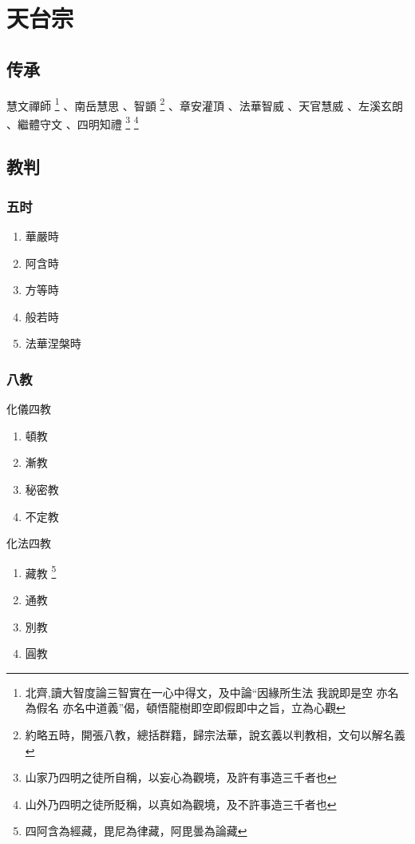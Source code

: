 \section{天台宗}

\subsection{传承}
慧文禪師
\footnote{北齊,讀大智度論三智實在一心中得文，及中論“因緣所生法 我說即是空 亦名為假名 亦名中道義”偈，頓悟龍樹即空即假即中之旨，立為心觀}
、南岳慧思
、智顗
\footnote{約略五時，開張八教，總括群籍，歸宗法華，說玄義以判教相，文句以解名義}
、章安灌頂
、法華智威
、天官慧威
、左溪玄朗
、繼體守文
、四明知禮
\footnote{山家乃四明之徒所自稱，以妄心為觀境，及許有事造三千者也}
\footnote{山外乃四明之徒所貶稱，以真如為觀境，及不許事造三千者也}

\subsection{教判}
\subsubsection{五时}
\begin{enumerate}
  \item 華嚴時
  \item 阿含時
  \item 方等時
  \item 般若時
  \item 法華涅槃時
\end{enumerate}

\subsubsection{八教}
化儀四教
\begin{enumerate}
  \item 頓教
  \item 漸教
  \item 秘密教
  \item 不定教
\end{enumerate}
化法四教
\begin{enumerate}
  \item 藏教
    \footnote{四阿含為經藏，毘尼為律藏，阿毘曇為論藏}
  \item 通教
  \item 別教
  \item 圓教
\end{enumerate}

